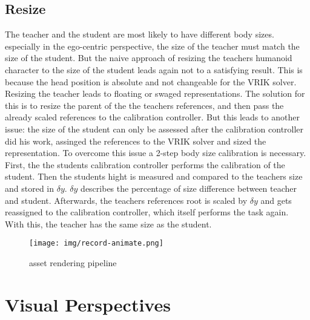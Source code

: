 \subsection{Resize}
The teacher and the student are most likely to have different body sizes. especially in the ego-centric perspective, the size of the teacher must match the size of the student. But the naive approach of resizing the teachers humanoid character to the size of the student leads again not to a satisfying result. This is because the head position is absolute and not changeable for the VRIK solver. Resizing the teacher leads to floating or swaged representations. The solution for this is to resize the parent of the the teachers references, and then pass the already scaled references to the calibration controller. But this leads to another issue: the size of the student can only be assessed after the calibration controller did his work, assinged the references to the VRIK solver and sized the representation. To overcome this issue a 2-step body size calibration is necessary. First, the the students calibration controller performs the calibration of the student. Then the students hight is measured and compared to the teachers size and stored in $\delta y$. $\delta y$ describes the percentage of size difference between teacher and student. Afterwards, the teachers references root is scaled by $\delta y$ and gets reassigned to the calibration controller, which itself performs the task again. With this, the teacher has the same size as the student.

\begin{figure}
	\centering
	\texttt{[image: img/record-animate.png]}
	\caption{asset rendering pipeline}
	\label{fig:record-animate}
\end{figure}
\section{Visual Perspectives}
